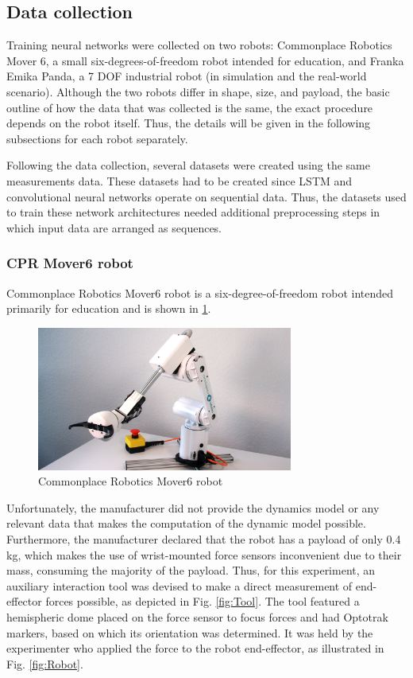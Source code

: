 \subsection{Data collection}

Training neural networks were collected on two robots: Commonplace Robotics Mover 6, a small six-degrees-of-freedom robot intended for education, and Franka Emika Panda, a 7 DOF industrial robot (in simulation and the real-world scenario). Although the two robots differ in shape, size, and payload, the basic outline of how the data that was collected is the same, the exact procedure depends on the robot itself. Thus, the details will be given in the following subsections for each robot separately.

Following the data collection, several datasets were created using the same measurements data. These datasets had to be created since LSTM and convolutional neural networks operate on sequential data. Thus, the datasets used to train these network architectures needed additional preprocessing steps in which input data are arranged as sequences.

\subsubsection{CPR Mover6 robot}

Commonplace Robotics Mover6 robot is a six-degree-of-freedom robot intended primarily for education \cite{Mover6} and is shown in \cref{fig:Mover6}. 

\begin{figure}
    \centering
    \includegraphics[width=0.75\textwidth]{slike/mover6.jpg}
    \caption[Commonplace Robotics Mover6 robot]{Commonplace Robotics Mover6 robot \cite{Mover6}}
    \label{fig:Mover6}
\end{figure}

Unfortunately, the manufacturer did not provide the dynamics model or any relevant data that makes the computation of the dynamic model possible. Furthermore, the manufacturer declared that the robot has a payload of only 0.4 kg, which makes the use of wrist-mounted force sensors inconvenient due to their mass, consuming the majority of the payload. Thus, for this experiment, an auxiliary interaction tool was devised to make a direct measurement of end-effector forces possible, as depicted in Fig. \ref{fig:Tool}. The tool featured a hemispheric dome placed on the force sensor to focus forces and had Optotrak markers, based on which its orientation was determined. It was held by the experimenter who applied the force to the robot end-effector, as illustrated in Fig. \ref{fig:Robot}. 

